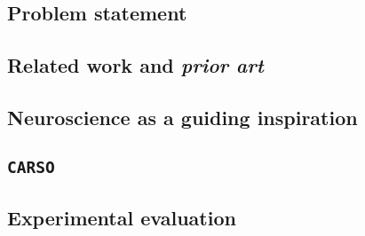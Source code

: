

\subsection{Problem statement}

\subsection{Related work and \textit{prior art}}

\subsection{Neuroscience as a guiding inspiration}

\subsection{\texttt{CARSO}}

\subsection{Experimental evaluation}
